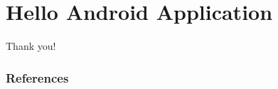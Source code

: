 \documentclass[ignorenonframetext,handout]{beamer}
\begin{document}



\section{Hello Android Application}
\label{sec:hello-android}



 


















\begin{frame}[plain]

  \begin{center}
    {\huge Thank you!}
    \\ \vspace*{2em}
    {\small {}}
  \end{center}

\end{frame}



\nocite{*}
\mode*
\appendix
\backupbegin
\begin{frame}
    \frametitle{References}
    
    {\tiny }
\end{frame}
\backupend
\end{document}
